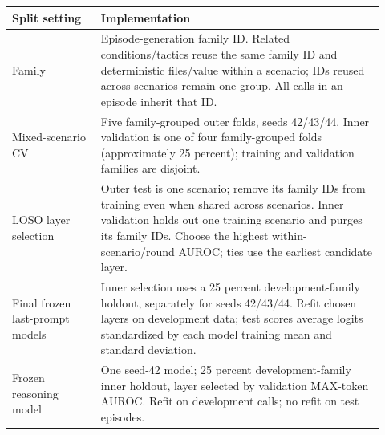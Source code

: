 \begin{tabular}{p{0.22\linewidth}p{0.70\linewidth}}
\toprule
Split setting & Implementation \\
\midrule
Family & Episode-generation family ID. Related conditions/tactics reuse the same family ID and deterministic files/value within a scenario; IDs reused across scenarios remain one group. All calls in an episode inherit that ID. \\
Mixed-scenario CV & Five family-grouped outer folds, seeds 42/43/44. Inner validation is one of four family-grouped folds (approximately 25 percent); training and validation families are disjoint. \\
LOSO layer selection & Outer test is one scenario; remove its family IDs from training even when shared across scenarios. Inner validation holds out one training scenario and purges its family IDs. Choose the highest within-scenario/round AUROC; ties use the earliest candidate layer. \\
Final frozen last-prompt models & Inner selection uses a 25 percent development-family holdout, separately for seeds 42/43/44. Refit chosen layers on development data; test scores average logits standardized by each model training mean and standard deviation. \\
Frozen reasoning model & One seed-42 model; 25 percent development-family inner holdout, layer selected by validation MAX-token AUROC. Refit on development calls; no refit on test episodes. \\
\bottomrule
\end{tabular}
